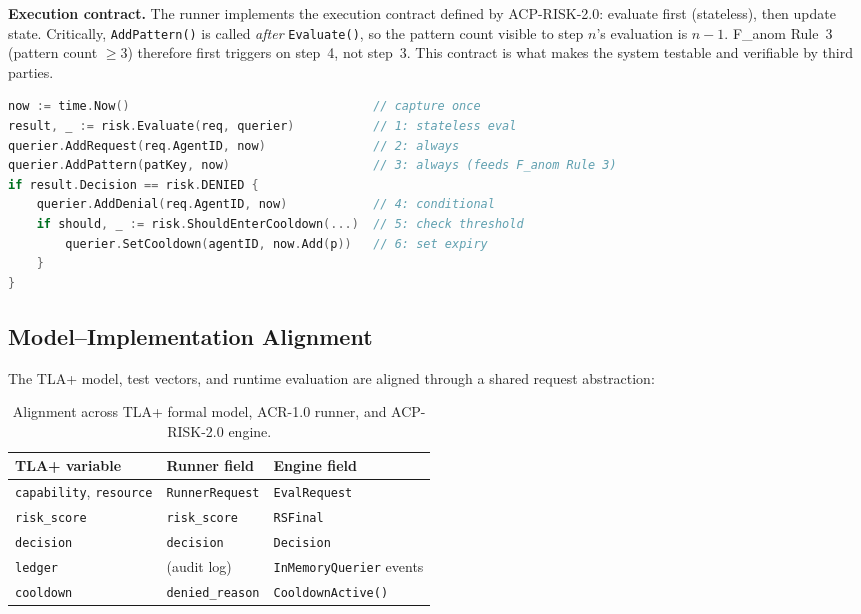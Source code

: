 \documentclass[11pt]{article}
\theoremstyle{definition}
\begin{document}
\noindent\textbf{Execution contract.}
The runner implements the execution contract defined by ACP-RISK-2.0:
evaluate first (stateless), then update state.
Critically, \texttt{AddPattern()} is called \emph{after} \texttt{Evaluate()},
so the pattern count visible to step $n$'s evaluation is $n-1$.
F\_anom Rule~3 (pattern count $\geq 3$) therefore first triggers on step~4, not step~3.
This contract is what makes the system testable and verifiable by third parties.

\begin{lstlisting}[language=Go, caption={ACR-1.0 execution contract in library mode.}]
now := time.Now()                                  // capture once
result, _ := risk.Evaluate(req, querier)           // 1: stateless eval
querier.AddRequest(req.AgentID, now)               // 2: always
querier.AddPattern(patKey, now)                    // 3: always (feeds F_anom Rule 3)
if result.Decision == risk.DENIED {
    querier.AddDenial(req.AgentID, now)            // 4: conditional
    if should, _ := risk.ShouldEnterCooldown(...)  // 5: check threshold
        querier.SetCooldown(agentID, now.Add(p))   // 6: set expiry
    }
}
\end{lstlisting}

\subsection{Model--Implementation Alignment}

The TLA+ model, test vectors, and runtime evaluation are aligned through a shared
request abstraction:

\begin{table}[h!]
\centering
\small
\begin{tabular}{@{}lll@{}}
\toprule
\textbf{TLA+ variable} & \textbf{Runner field} & \textbf{Engine field} \\
\midrule
\texttt{capability}, \texttt{resource} & \texttt{RunnerRequest} & \texttt{EvalRequest} \\
\texttt{risk\_score}                   & \texttt{risk\_score}   & \texttt{RSFinal} \\
\texttt{decision}                      & \texttt{decision}      & \texttt{Decision} \\
\texttt{ledger}                        & (audit log)            & \texttt{InMemoryQuerier} events \\
\texttt{cooldown}                      & \texttt{denied\_reason} & \texttt{CooldownActive()} \\
\bottomrule
\end{tabular}
\caption{Alignment across TLA+ formal model, ACR-1.0 runner, and ACP-RISK-2.0 engine.}
\end{table}
\end{document}
